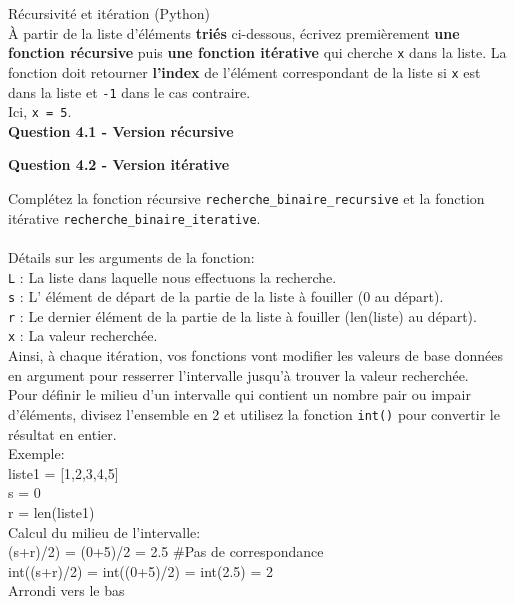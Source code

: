     \begin{Exercice}[20 minutes] Récursivité et itération (Python)\\
    
    À partir de la liste d'éléments \textbf{triés} ci-dessous, écrivez premièrement \textbf{une fonction récursive} puis \textbf{une fonction itérative} qui cherche \lstinline{x} dans la liste. La fonction doit retourner \textbf{l'index} de l'élément correspondant de la liste si \lstinline{x} est dans la liste et \lstinline{-1} dans le cas contraire.\\
    Ici, \lstinline{x = 5}.\\
    
    \textbf{Question 4.1 - Version récursive}
    
    
    \textbf{Question 4.2 - Version itérative}
    
    
    
        \begin{conseil}
            Complétez la fonction récursive \lstinline{recherche_binaire_recursive} et la fonction itérative \lstinline{recherche_binaire_iterative}.\\\\
            Détails sur les arguments de la fonction:\\
            \lstinline{L} : La liste dans laquelle nous effectuons la recherche.\\
            \lstinline{s} : L' élément de départ de la partie de la liste à fouiller (0 au départ).\\
            \lstinline{r} : Le dernier élément de la partie de la liste à fouiller (len(liste) au départ).\\
            \lstinline{x} : La valeur recherchée.\\
    
            Ainsi, à chaque itération, vos fonctions vont modifier les valeurs de base données en argument pour resserrer l'intervalle jusqu'à trouver la valeur recherchée.\\        
            Pour définir le milieu d'un intervalle qui contient un nombre pair ou impair d'éléments, divisez l'ensemble en 2 et utilisez la fonction \lstinline{int()} pour convertir le résultat en entier. \\
            Exemple:\\
                liste1 = [1,2,3,4,5]\\
                s = 0\\
                r = len(liste1)\\
                Calcul du milieu de l'intervalle:\\
                (s+r)/2) = (0+5)/2 = 2.5 \#Pas de correspondance\\
                int((s+r)/2) = int((0+5)/2) = int(2.5) = 2 \\
                Arrondi vers le bas
            \\
            

\end{conseil}
\end{Exercice}
